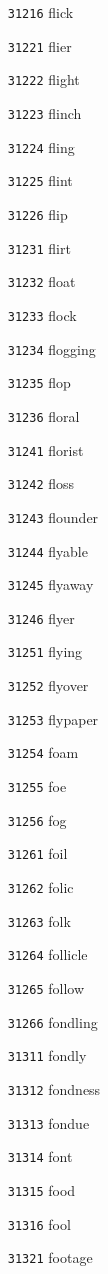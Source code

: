 \documentclass[twoside,11pt]{article}
\begin{document}
\begin{multicols}{5}
\begin{enumerate}
\item[\texttt{31216}] flick
\item[\texttt{31221}] flier
\item[\texttt{31222}] flight
\item[\texttt{31223}] flinch
\item[\texttt{31224}] fling
\item[\texttt{31225}] flint
\item[\texttt{31226}] flip
\item[\texttt{31231}] flirt
\item[\texttt{31232}] float
\item[\texttt{31233}] flock
\item[\texttt{31234}] flogging
\item[\texttt{31235}] flop
\item[\texttt{31236}] floral
\item[\texttt{31241}] florist
\item[\texttt{31242}] floss
\item[\texttt{31243}] flounder
\item[\texttt{31244}] flyable
\item[\texttt{31245}] flyaway
\item[\texttt{31246}] flyer
\item[\texttt{31251}] flying
\item[\texttt{31252}] flyover
\item[\texttt{31253}] flypaper
\item[\texttt{31254}] foam
\item[\texttt{31255}] foe
\item[\texttt{31256}] fog
\item[\texttt{31261}] foil
\item[\texttt{31262}] folic
\item[\texttt{31263}] folk
\item[\texttt{31264}] follicle
\item[\texttt{31265}] follow
\item[\texttt{31266}] fondling
\item[\texttt{31311}] fondly
\item[\texttt{31312}] fondness
\item[\texttt{31313}] fondue
\item[\texttt{31314}] font
\item[\texttt{31315}] food
\item[\texttt{31316}] fool
\item[\texttt{31321}] footage

\end{enumerate}
\end{multicols}
\end{document}
